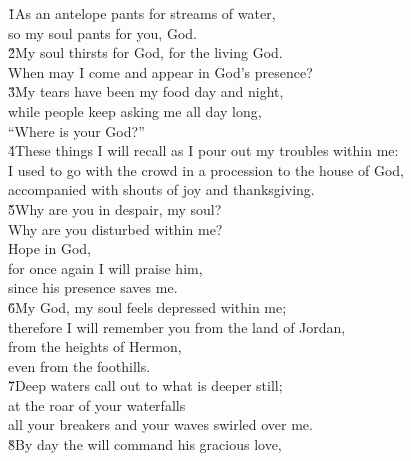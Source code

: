 
\begin{poetry}
\poeml \v{1}As an antelope pants for streams of water, \\
\poemll    so my soul pants for you, God. \\
\poeml \v{2}My soul thirsts for God, for the living God. \\
\poemll    When may I come and appear in God's presence? \\
\poeml \v{3}My tears have been my food day and night, \\
\poemll    while people keep asking me all day long, \\
\poemlll       ``Where is your God?'' \\
\poeml \v{4}These things I will recall as I pour out my troubles within me: \\
\poemll    I used to go with the crowd in a procession to the house of God, \\
\poemlll       accompanied with shouts of joy and thanksgiving. \\
\poeml \v{5}Why are you in despair, my soul? \\
\poemll    Why are you disturbed within me? \\
\poeml Hope in God, \\
\poemll    for once again I will praise him, \\
\poemlll       since his presence saves me. \\
\poeml \v{6}My God, my soul feels depressed within me; \\
\poemll    therefore I will remember you from the land of Jordan, \\
\poeml from the heights of Hermon, \\
\poemll    even from the foothills. \\
\poeml \v{7}Deep waters call out to what is deeper still; \\
\poemll    at the roar of your waterfalls \\
\poemlll       all your breakers and your waves swirled over me. \\
\poeml \v{8}By day the  will command his gracious love, \\

\end{poetry}

